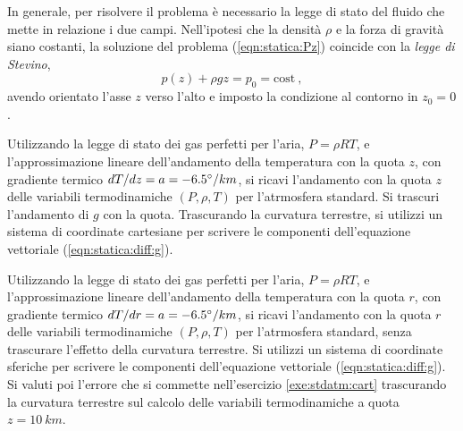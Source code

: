 In generale, per risolvere il problema è necessario la legge di stato del fluido che mette in relazione i due campi.
%
\newline \noindent
Nell'ipotesi che la densità $\rho$ e la forza di gravità siano costanti, la soluzione del problema (\ref{eqn:statica:Pz}) coincide con la \textit{legge di Stevino},
\begin{equation}
 p(z) + \rho g z = p_0 = \text{cost} \ ,
\end{equation}
avendo orientato l'asse $z$ verso l'alto e imposto la condizione al contorno in $z_0 = 0$.
\begin{exercise}\label{exe:stdatm:cart}
    Utilizzando la legge di stato dei gas perfetti per l'aria, $P = \rho R T$, e l'approssimazione lineare dell'andamento della temperatura con la quota $z$, con gradiente termico $dT/dz=a=-6.5\degree/km$, si ricavi l'andamento con la quota $z$ delle variabili termodinamiche $(P,\rho, T)$ per l'atrmosfera standard. Si trascuri l'andamento di $g$ con la quota. Trascurando la curvatura terrestre, si utilizzi un sistema di coordinate cartesiane per scrivere le componenti dell'equazione vettoriale (\ref{eqn:statica:diff:g}).
\end{exercise}
\begin{exercise}\label{exe:stdatm:sphe}
    Utilizzando la legge di stato dei gas perfetti per l'aria, $P = \rho R T$, e l'approssimazione lineare dell'andamento della temperatura con la quota $r$, con gradiente termico $dT/dr=a=-6.5\degree/km$, si ricavi l'andamento con la quota $r$ delle variabili termodinamiche $(P,\rho, T)$ per l'atrmosfera standard, senza trascurare l'effetto della curvatura terrestre. Si utilizzi un sistema di coordinate sferiche per scrivere le componenti dell'equazione vettoriale (\ref{eqn:statica:diff:g}). Si valuti poi l'errore che si commette nell'esercizio \ref{exe:stdatm:cart} trascurando la curvatura terrestre sul calcolo delle variabili termodinamiche a quota $z = 10 \ km$.
\end{exercise}
%
